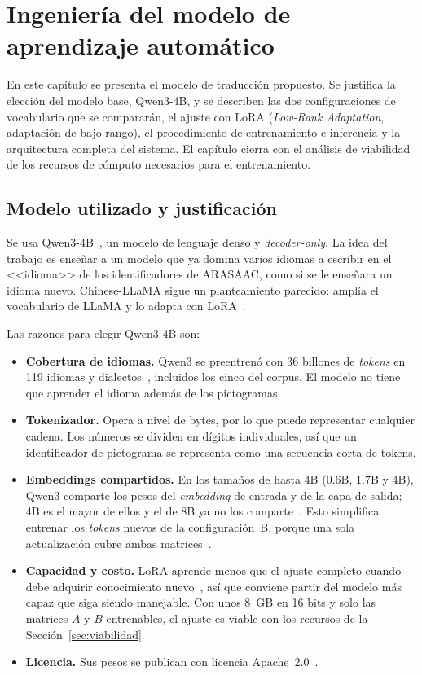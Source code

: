 \clearpage
\section{Ingeniería del modelo de aprendizaje automático}
\label{sec:ingenieria-modelo}

En este capítulo se presenta el modelo de traducción propuesto. Se justifica la elección del modelo base, Qwen3-4B, y se describen las dos configuraciones de vocabulario que se compararán, el ajuste con LoRA (\textit{Low-Rank Adaptation}, adaptación de bajo rango), el procedimiento de entrenamiento e inferencia y la arquitectura completa del sistema. El capítulo cierra con el análisis de viabilidad de los recursos de cómputo necesarios para el entrenamiento.

\subsection{Modelo utilizado y justificación}
\label{sec:modelo}

Se usa Qwen3-4B~\cite{yang2025qwen3}, un modelo de lenguaje denso y \textit{decoder-only}. La idea del trabajo es enseñar a un modelo que ya domina varios idiomas a escribir en el <<idioma>> de los identificadores de ARASAAC, como si se le enseñara un idioma nuevo. Chinese-LLaMA sigue un planteamiento parecido: amplía el vocabulario de LLaMA y lo adapta con LoRA~\cite{cui2023efficient}.

Las razones para elegir Qwen3-4B son:
\begin{itemize}
    \item \textbf{Cobertura de idiomas.} Qwen3 se preentrenó con 36 billones de \textit{tokens} en 119 idiomas y dialectos~\cite{yang2025qwen3}, incluidos los cinco del corpus. El modelo no tiene que aprender el idioma además de los pictogramas.
    \item \textbf{Tokenizador.} Opera a nivel de bytes, por lo que puede representar cualquier cadena. Los números se dividen en dígitos individuales, así que un identificador de pictograma se representa como una secuencia corta de tokens.
    \item \textbf{Embeddings compartidos.} En los tamaños de hasta 4B (0.6B, 1.7B y 4B), Qwen3 comparte los pesos del \textit{embedding} de entrada y de la capa de salida; 4B es el mayor de ellos y el de 8B ya no los comparte~\cite{yang2025qwen3}. Esto simplifica entrenar los \textit{tokens} nuevos de la configuración~B, porque una sola actualización cubre ambas matrices~\cite{peft}.
    \item \textbf{Capacidad y costo.} LoRA aprende menos que el ajuste completo cuando debe adquirir conocimiento nuevo~\cite{biderman2024lora}, así que conviene partir del modelo más capaz que siga siendo manejable. Con unos 8~GB en 16 bits y solo las matrices $A$ y $B$ entrenables, el ajuste es viable con los recursos de la Sección~\ref{sec:viabilidad}.
    \item \textbf{Licencia.} Sus pesos se publican con licencia Apache~2.0~\cite{yang2025qwen3}.
\end{itemize}

